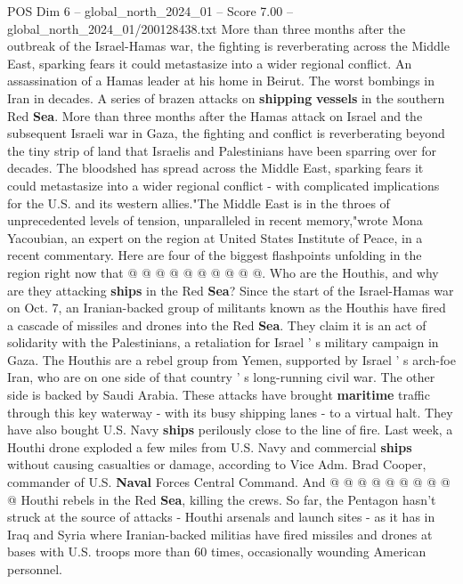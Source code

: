 \begin{textsample}{POS Dim 6 – global\_north\_2024\_01 – Score 7.00 – global\_north\_2024\_01/200128438.txt}  \label{ex:f6_pos_117}
More than three months after the outbreak of the Israel-Hamas war, the fighting is reverberating across the Middle East, sparking fears it could metastasize into a wider regional conflict.
An assassination of a Hamas leader at his home in Beirut.
The worst bombings in Iran in decades.
A series of brazen attacks on \textbf{shipping} \textbf{vessels} in the southern Red \textbf{Sea}.
More than three months after the Hamas attack on Israel and the subsequent Israeli war in Gaza, the fighting and conflict is reverberating beyond the tiny strip of land that Israelis and Palestinians have been sparring over for decades.
The bloodshed has spread across the Middle East, sparking fears it could metastasize into a wider regional conflict - with complicated implications for the U.S. and its western allies."The Middle East is in the throes of unprecedented levels of tension, unparalleled in recent memory,"wrote Mona Yacoubian, an expert on the region at United States Institute of Peace, in a recent commentary.
Here are four of the biggest flashpoints unfolding in the region right now that @ @ @ @ @ @ @ @ @ @.
Who are the Houthis, and why are they attacking \textbf{ships} in the Red \textbf{Sea}?
Since the start of the Israel-Hamas war on Oct. 7, an Iranian-backed group of militants known as the Houthis have fired a cascade of missiles and drones into the Red \textbf{Sea}.
They claim it is an act of solidarity with the Palestinians, a retaliation for Israel ' s military campaign in Gaza.
The Houthis are a rebel group from Yemen, supported by Israel ' s arch-foe Iran, who are on one side of that country ' s long-running civil war.
The other side is backed by Saudi Arabia.
These attacks have brought \textbf{maritime} traffic through this key waterway - with its busy shipping lanes - to a virtual halt.
They have also bought U.S.
Navy \textbf{ships} perilously close to the line of fire.
Last week, a Houthi drone exploded a few miles from U.S.
Navy and commercial \textbf{ships} without causing casualties or damage, according to Vice Adm.
Brad Cooper, commander of U.S. \textbf{Naval} Forces Central Command.
And @ @ @ @ @ @ @ @ @ @ Houthi rebels in the Red \textbf{Sea}, killing the crews.
So far, the Pentagon hasn't struck at the source of attacks - Houthi arsenals and launch sites - as it has in Iraq and Syria where Iranian-backed militias have fired missiles and drones at bases with U.S. troops more than 60 times, occasionally wounding American personnel.

\end{textsample}

